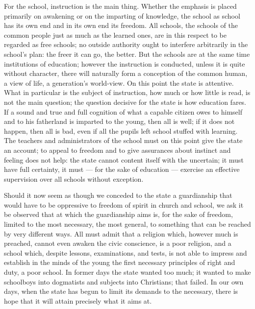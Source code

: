 \documentclass[12pt,a4paper,openany]{book}
\newcommand{\opage}[1]{\marginnote{\footnotesize\textit{[#1]}}}
\begin{document}
For the school, instruction is the main thing. Whether
the emphasis is placed primarily on awakening or on the imparting of knowledge,
the school as school has its own end and
in its own end its freedom. All schools, the schools of the common people
just as much as the learned ones, are in this respect
to be regarded as free schools; no outside
authority ought to interfere arbitrarily in the school's plan: the
\setcounter{footnote}{0}%
\opage{5}freer it can go, the better. But the schools are at the same time
institutions of education; however the instruction is conducted,
unless it is quite without character, there will naturally
form a conception of the common human, a
view of life, a generation's world-view. On this
point the state is attentive. What in particular
is the subject of instruction, how much or how little is
read, is not the main question; the question decisive for the state
is how education fares.
If a sound and true and full cognition
of what a capable citizen owes to himself and
to his fatherland is imparted to the young, then all is well; if it does not happen,
then all is bad, even if all the pupils left school
stuffed with learning. The teachers and administrators of the school must on this
point give the state an account; to appeal to freedom
and to give assurances about instinct and feeling
does not help: the state cannot content itself with the uncertain; it
must have full certainty, it must --- for the sake of education ---
exercise an effective supervision over all schools
without exception.

Should it now seem as though we conceded to the state
a guardianship that would have to be oppressive to freedom of spirit
in church and school, we ask it be observed that
at which the guardianship aims is, for the sake of freedom,
limited to the most necessary, the most general,
to something that can be reached by very different
ways. All must admit that a religion which,
however much is preached, cannot even awaken
the civic conscience, is a poor religion, and
a school which, despite lessons, examinations, and tests,
is not able to impress and establish in the
\setcounter{footnote}{0}%
\opage{6}minds of the young the first necessary principles of right and
duty, a poor school. In former days the state wanted
too much; it wanted to make schoolboys into dogmatists
and subjects into Christians; that failed. In our
own days, when the state has begun to limit its demands
to the necessary, there is hope that it
will attain precisely what it aims at.
\end{document}

